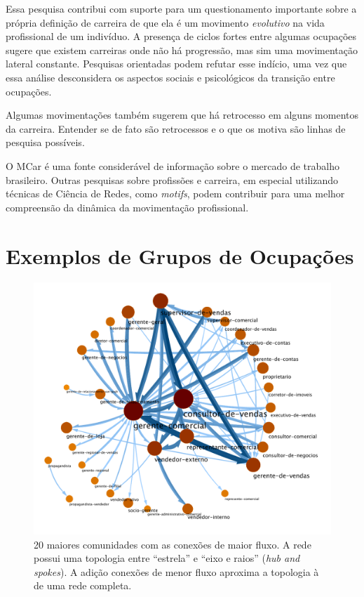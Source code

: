 \documentclass[
  article,
  11pt,
  a4paper,
  english,
  brazil,
  sumario=tradicional]{abntex2}
\begin{document}
Essa pesquisa contribui com suporte para um questionamento importante sobre a própria definição de carreira de que ela é um movimento \textit{evolutivo} na vida profissional de um indivíduo. A presença de ciclos fortes entre algumas ocupações sugere que existem carreiras onde não há progressão, mas sim uma movimentação lateral constante. Pesquisas orientadas podem refutar esse indício, uma vez que essa análise desconsidera os aspectos sociais e psicológicos da transição entre ocupações.

Algumas movimentações também sugerem que há retrocesso em alguns momentos da carreira. Entender se de fato são retrocessos e o que os motiva são linhas de pesquisa possíveis.

O MCar é uma fonte considerável de informação sobre o mercado de trabalho brasileiro. Outras pesquisas sobre profissões e carreira, em especial utilizando técnicas de Ciência de Redes, como \textit{motifs}, podem contribuir para uma melhor compreensão da dinâmica da movimentação profissional.

\newpage

\appendix

\section{Exemplos de Grupos de Ocupações}

\begin{figure}[h]
  \centering
  \includegraphics[width=0.7\linewidth]{ex-sobreposicao-consultor-de-vendas.pdf}
  \caption{20 maiores comunidades com as conexões de maior fluxo. A rede possui uma topologia entre \enquote{estrela} e \enquote{eixo e raios} (\textit{hub and spokes}). A adição conexões de menor fluxo aproxima a topologia à de uma rede completa.}
  \label{fig:ex-sobreposicao-vendas}
\end{figure}
\end{document}

